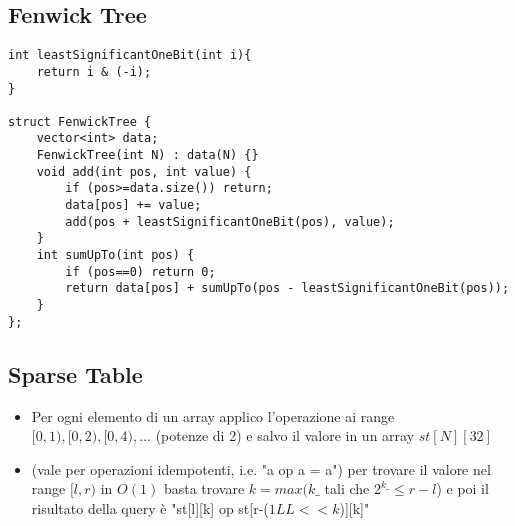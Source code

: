 \subsection{Fenwick Tree}
\begin{lstlisting}
int leastSignificantOneBit(int i){
	return i & (-i);
}

struct FenwickTree {
	vector<int> data;
	FenwickTree(int N) : data(N) {}
	void add(int pos, int value) {
		if (pos>=data.size()) return;
		data[pos] += value;
		add(pos + leastSignificantOneBit(pos), value);
	}
	int sumUpTo(int pos) {
		if (pos==0) return 0;
		return data[pos] + sumUpTo(pos - leastSignificantOneBit(pos));
	}
};
\end{lstlisting}

\subsection{Sparse Table}
\begin{itemize}
    \item Per ogni elemento di un array applico l'operazione ai range $[0,1), [0,2), [0,4), ...$ (potenze di 2) e salvo il valore in un array $st[N][32]$
    \item (vale per operazioni idempotenti, i.e. "a op a = a") per trovare il valore nel range $[l,r)$ in $O(1)$ basta trovare $k = max(k\_$ tali che $2^{k\_} \leq r-l$) e poi il risultato della query è "st[l][k] op st[r-($1LL<<k$)][k]"
\end{itemize}
